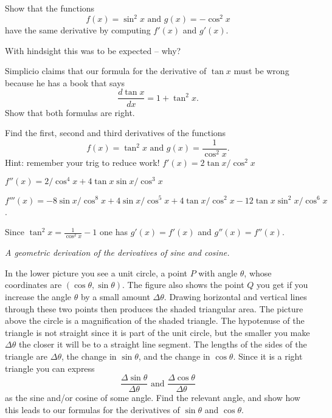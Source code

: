\begin{multicols}{2}
\problem  Show that the functions 
\[
f(x) = \sin^2 x \text{ and } g(x) = -\cos^2x
\]
have the same derivative by computing $f'(x)$ and $g'(x)$.




With hindsight this was to be expected -- why?




\problem Simplicio claims that our formula for the derivative of $\tan x$ must 
be wrong because he has a book that says
\[
\frac{d\tan x} {dx} = 1+\tan^2 x.
\]
Show that both formulas are right.




\problem Find the first, second and third derivatives of the functions 
\[
f(x) = \tan^2 x \text{ and }
g(x) = \frac{1}{\cos^2 x}.
\]
Hint: remember your trig to reduce work!
\answer 
$f'(x) = 2\tan x/\cos^2 x$




$f''(x) = 2/\cos^4 x + 4\tan x \sin x/\cos^3 x$




$f'''(x) = -8\sin x/\cos^8 x + 4\sin x/\cos^5 x
           + 4\tan x/\cos^2x - 12\tan x \sin^2x/\cos^6x$.




Since $\tan^2 x= \frac{1}{\cos^2 x}-1$ one has $g'(x) = f'(x)$ and
$g''(x) = f''(x)$.
\endanswer




\problem \textit{A geometric derivation of the derivatives of sine and cosine.} 




\centerline{}




In the lower picture you see a unit circle, a point $P$ with angle $ \theta $, whose
coordinates are $(\cos \theta, \sin \theta)$.  The figure also shows the point $Q$
you get if you increase the angle $\theta$ by a small amount
$\Delta\theta$. Drawing horizontal and vertical lines through these two points
then produces the shaded triangular area.  The picture above the circle is a
magnification of the shaded triangle.  The hypotenuse of the triangle is not
straight since it is part of the unit circle, but the smaller you make
$\Delta\theta$ the closer it will be to a straight line segment.  The lengths of
the sides of the triangle are $\Delta\theta$, the change in $\sin\theta$, and the
change in $\cos \theta$.  Since it is a right triangle you can express
\[
\frac{\Delta\sin \theta} {\Delta\theta} \text{ and }
\frac{\Delta\cos\theta} {\Delta\theta}
\]
as the sine and/or cosine of some angle.  Find the relevant angle, and show how this
leads to our formulas for the derivatives of $\sin\theta$ and $\cos\theta$.





\end{multicols}
